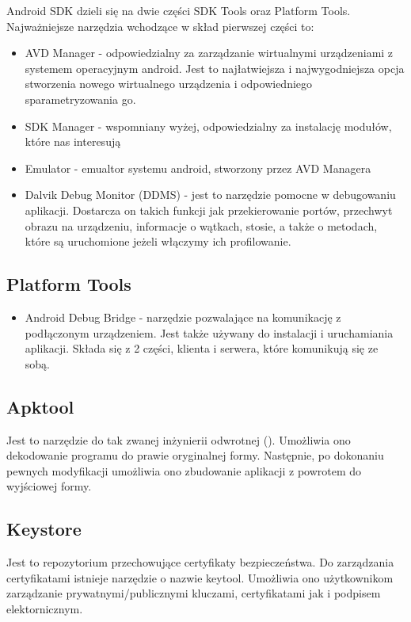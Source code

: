 Android SDK dzieli się na dwie części SDK Tools oraz Platform Tools. Najważniejsze narzędzia wchodzące w skład pierwszej części to:
\begin{itemize}
\item AVD Manager - odpowiedzialny za zarządzanie wirtualnymi urządzeniami z systemem operacyjnym android. Jest to najłatwiejsza i najwygodniejsza opcja stworzenia nowego wirtualnego urządzenia i odpowiedniego sparametryzowania go.
\item SDK Manager - wspomniany wyżej, odpowiedzialny za instalację modułów, które nas interesują
\item Emulator - emualtor systemu android, stworzony przez AVD Managera
\item Dalvik Debug Monitor (DDMS) \label{ddms}- jest to narzędzie pomocne w debugowaniu aplikacji. Dostarcza on takich funkcji jak przekierowanie portów, przechwyt obrazu na urządzeniu, informacje o wątkach, stosie, a także o metodach, które są uruchomione jeżeli włączymy ich profilowanie.
\end{itemize}

\subsection{Platform Tools}

\begin{itemize}
\item Android Debug Bridge \label{adb}- narzędzie pozwalające na komunikację z podłączonym urządzeniem. Jest także używany do instalacji i uruchamiania aplikacji. Składa się z 2 części, klienta i serwera, które komunikują się ze sobą.
\end{itemize}

\subsection{Apktool}

Jest to narzędzie do tak zwanej inżynierii odwrotnej (). Umożliwia ono dekodowanie programu do prawie oryginalnej formy. Następnie, po dokonaniu pewnych modyfikacji umożliwia ono zbudowanie aplikacji z powrotem do wyjściowej formy.\cite{doc:apktool}

\subsection{Keystore}

Jest to repozytorium przechowujące certyfikaty bezpieczeństwa. Do zarządzania certyfikatami istnieje narzędzie o nazwie keytool. Umożliwia ono użytkownikom zarządzanie prywatnymi/publicznymi kluczami, certyfikatami jak i podpisem elektornicznym.\cite{doc:keytool}

